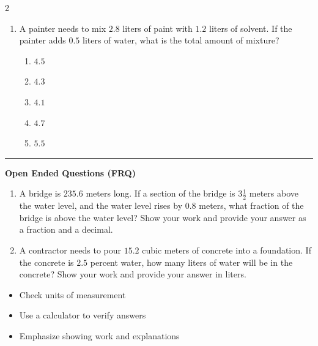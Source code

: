 \documentclass[10pt]{article}
\begin{document}
\begin{multicols}{2}
\begin{enumerate}[label=\textbf{Q\arabic*.}, leftmargin=*, itemsep=6pt, parsep=0pt]
  \item \small A painter needs to mix $2.8$ liters of paint with $1.2$ liters of solvent. If the painter adds $0.5$ liters of water, what is the total amount of mixture?
  \begin{enumerate}[label=(\Alph*), leftmargin=0.6cm, nosep, itemsep=2pt]
    \item $4.5$
    \item $4.3$
    \item $4.1$
    \item $4.7$
    \item $5.5$
  \end{enumerate}

\end{enumerate}
\end{multicols}

\vspace{-0.2cm}
\hrule
\vspace{0.2cm}
\textbf{\small Open Ended Questions (FRQ)}
\begin{enumerate}[label=\textbf{Q\arabic*.}, start=9, itemsep=5pt, topsep=0pt]

  \item \small A bridge is $235.6$ meters long. If a section of the bridge is $3 \frac{1}{2}$ meters above the water level, and the water level rises by $0.8$ meters, what fraction of the bridge is above the water level? Show your work and provide your answer as a fraction and a decimal. \vspace{2cm}

  \item \small A contractor needs to pour $15.2$ cubic meters of concrete into a foundation. If the concrete is $2.5$ percent water, how many liters of water will be in the concrete? Show your work and provide your answer in liters. \vspace{2cm}

\end{enumerate}

\vfill

\begin{tcolorbox}[colback=blue!5, colframe=mainblue!50, title=\small \textbf{Chef's Tips}, fonttitle=\bfseries, bottom=1mm]
\begin{itemize}[noitemsep, topsep=2pt, leftmargin=0.5cm]
  \item \scriptsize Check units of measurement\item \scriptsize Use a calculator to verify answers\item \scriptsize Emphasize showing work and explanations
\end{itemize}
\end{tcolorbox}
\end{document}
